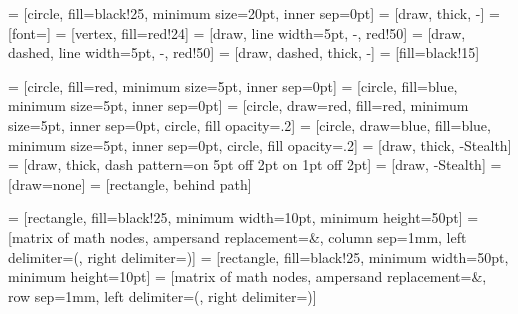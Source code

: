 \usepackage{tikz}
\usetikzlibrary{spy, arrows, arrows.meta, shapes, shapes.multipart, fit, matrix}

 = [circle, fill=black!25, minimum size=20pt, inner sep=0pt]
 = [draw, thick, -]
 = [font=\small]
 = [vertex, fill=red!24]
 = [draw, line width=5pt, -, red!50]
 = [draw, dashed, line width=5pt, -, red!50]
 = [draw, dashed, thick, -]
 = [fill=black!15]

 = [circle, fill=red, minimum size=5pt, inner sep=0pt]
 = [circle, fill=blue, minimum size=5pt, inner sep=0pt]
 = [circle, draw=red, fill=red, minimum size=5pt, inner sep=0pt, circle, fill opacity=.2]
 = [circle, draw=blue, fill=blue, minimum size=5pt, inner sep=0pt, circle, fill opacity=.2]
 = [draw, thick, -Stealth]
 = [draw, thick, dash pattern=on 5pt off 2pt on 1pt off 2pt]
 = [draw, -Stealth]
 = [draw=none]
 = [rectangle, behind path]

 = [rectangle, fill=black!25, minimum width=10pt, minimum height=50pt]
 = [matrix of math nodes, ampersand replacement=\&, column sep=1mm, left delimiter=(, right delimiter=)]
 = [rectangle, fill=black!25, minimum width=50pt, minimum height=10pt]
 = [matrix of math nodes, ampersand replacement=\&, row sep=1mm, left delimiter=(, right delimiter=)]
